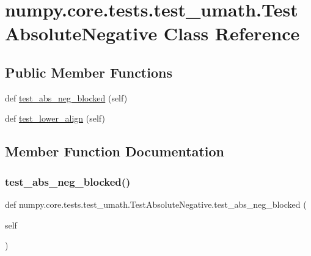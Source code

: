 \hypertarget{classnumpy_1_1core_1_1tests_1_1test__umath_1_1TestAbsoluteNegative}{}\section{numpy.\+core.\+tests.\+test\+\_\+umath.\+Test\+Absolute\+Negative Class Reference}
\label{classnumpy_1_1core_1_1tests_1_1test__umath_1_1TestAbsoluteNegative}
\subsection*{Public Member Functions}
\begin{DoxyCompactItemize}
\item 
def \hyperlink{classnumpy_1_1core_1_1tests_1_1test__umath_1_1TestAbsoluteNegative_a607c73f090c3bc58397b969eb6efda5b}{test\+\_\+abs\+\_\+neg\+\_\+blocked} (self)
\item 
def \hyperlink{classnumpy_1_1core_1_1tests_1_1test__umath_1_1TestAbsoluteNegative_a7ce0032ed5ae7b276e3c07bb690445df}{test\+\_\+lower\+\_\+align} (self)
\end{DoxyCompactItemize}


\subsection{Member Function Documentation}
\mbox{\label{classnumpy_1_1core_1_1tests_1_1test__umath_1_1TestAbsoluteNegative_a607c73f090c3bc58397b969eb6efda5b}} 
\subsubsection{\texorpdfstring{test\+\_\+abs\+\_\+neg\+\_\+blocked()}{test\_abs\_neg\_blocked()}}
{\footnotesize\ttfamily def numpy.\+core.\+tests.\+test\+\_\+umath.\+Test\+Absolute\+Negative.\+test\+\_\+abs\+\_\+neg\+\_\+blocked (\begin{DoxyParamCaption}\item[{}]{self }\end{DoxyParamCaption})}

